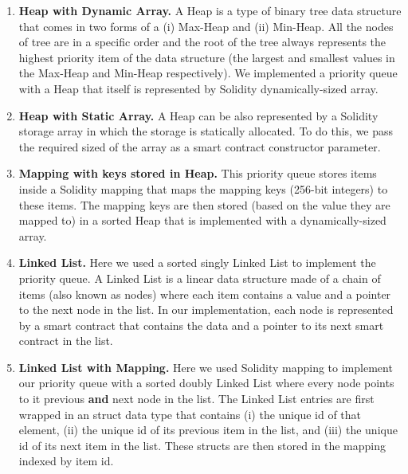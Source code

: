 \begin{enumerate}


\item\textbf{{Heap with Dynamic Array.}} A Heap is a type of binary tree data structure that comes in two forms of a (i) Max-Heap and (ii) Min-Heap. All the nodes of tree are in a specific order and the root of the tree always represents the highest priority item of the data structure (the largest and smallest values in the Max-Heap and Min-Heap respectively). We implemented a priority queue with a Heap that itself is represented by Solidity dynamically-sized array.  


\item\textbf{{Heap with Static Array.}} A Heap can be also represented by a Solidity storage array in which the storage is statically allocated. To do this, we pass the required sized of the array as a smart contract constructor parameter. 


\item\textbf{{Mapping with keys stored in Heap.}} This priority queue stores items inside a Solidity mapping that maps the mapping keys (256-bit integers) to these items. The mapping keys are then stored (based on the value they are mapped to) in a sorted Heap that is implemented with a dynamically-sized array.


\item\textbf{{Linked List.}} Here we used a sorted singly Linked List to implement the priority queue. A Linked List is a linear data structure made of a chain of items (also known as nodes) where each item contains a value and a pointer to the next node in the list. In our implementation, each node is represented by a smart contract that contains the data and a pointer to its next smart contract in the list.


\item\textbf{{Linked List with Mapping.}} Here we used Solidity mapping to implement our priority queue with a sorted doubly Linked List where every node points to it previous \textbf{and} next node in the list. The Linked List entries are first wrapped in an struct data type that contains (i) the unique id of that element, (ii) the unique id of its previous item in the list, and (iii) the unique id of its next item in the list. These structs are then stored in the mapping indexed by item id. 


\end{enumerate}

